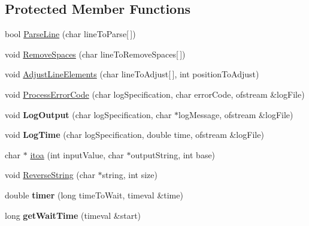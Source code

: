\subsection*{Protected Member Functions}
\begin{DoxyCompactItemize}
\item 
bool \hyperlink{class_meta_data_info_a56a4ddcd4429a6324c7715e8deb199f1}{Parse\+Line} (char line\+To\+Parse\mbox{[}$\,$\mbox{]})
\item 
void \hyperlink{class_meta_data_info_a525056e90a718a3f42147b0ec8c9456a}{Remove\+Spaces} (char line\+To\+Remove\+Spaces\mbox{[}$\,$\mbox{]})
\item 
void \hyperlink{class_meta_data_info_ad22e892de632d1d0800099e7daf7c941}{Adjust\+Line\+Elements} (char line\+To\+Adjust\mbox{[}$\,$\mbox{]}, int position\+To\+Adjust)
\item 
void \hyperlink{class_meta_data_info_a5bc8f03132a3a575433517cc1de3295d}{Process\+Error\+Code} (char log\+Specification, char error\+Code, ofstream \&log\+File)
\item 
void {\bfseries Log\+Output} (char log\+Specification, char $\ast$log\+Message, ofstream \&log\+File)\hypertarget{class_meta_data_info_a6150ce3a4dd26ea2326eb838ef9fef6f}{}\label{class_meta_data_info_a6150ce3a4dd26ea2326eb838ef9fef6f}

\item 
void {\bfseries Log\+Time} (char log\+Specification, double time, ofstream \&log\+File)\hypertarget{class_meta_data_info_ad3c6ae239217ba112655adc9a72b2782}{}\label{class_meta_data_info_ad3c6ae239217ba112655adc9a72b2782}

\item 
char $\ast$ \hyperlink{class_meta_data_info_afa768773ce2a23be28e0451983911e33}{itoa} (int input\+Value, char $\ast$output\+String, int base)
\item 
void \hyperlink{class_meta_data_info_a03d279a6dc693da0099cf016541b34eb}{Reverse\+String} (char $\ast$string, int size)
\item 
double {\bfseries timer} (long time\+To\+Wait, timeval \&time)\hypertarget{class_meta_data_info_aa7f090c3467b7942f0a0364896b4e920}{}\label{class_meta_data_info_aa7f090c3467b7942f0a0364896b4e920}

\item 
long {\bfseries get\+Wait\+Time} (timeval \&start)\hypertarget{class_meta_data_info_a0c7b48a12b0d08a36920f6cfbb4e2295}{}\label{class_meta_data_info_a0c7b48a12b0d08a36920f6cfbb4e2295}

\end{DoxyCompactItemize}


